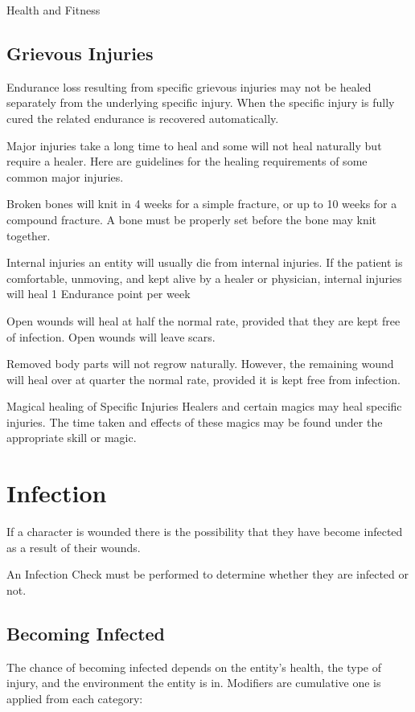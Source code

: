 \begin{Chapter}{Health and Fitness}
\subsection{Grievous Injuries}

Endurance loss resulting from specific grievous injuries may not be
healed separately from the underlying specific injury.  When the
specific injury is fully cured the related endurance is recovered
automatically.

Major injuries take a long time to heal and some will not heal
naturally but require a healer.  Here are guidelines for the healing
requirements of some common major injuries.

Broken bones will knit in 4 weeks for a simple fracture, or up to 10
weeks for a compound fracture.  A bone must be properly set before the
bone may knit together.

Internal injuries an entity will usually die from internal injuries.
If the patient is comfortable, unmoving, and kept alive by a healer or
physician, internal injuries will heal 1 Endurance point per week

Open wounds will heal at half the normal rate, provided that they are
kept free of infection. Open wounds will leave scars.

Removed body parts will not regrow naturally.  However, the remaining
wound will heal over at quarter the normal rate, provided it is kept
free from infection.

Magical healing of Specific Injuries Healers and certain magics may
heal specific injuries. The time taken and effects of these magics may
be found under the appropriate skill or magic.


\section{Infection}

If a character is wounded there is the possibility that they have
become infected as a result of their wounds.

An Infection Check must be performed to determine whether they are
infected or not.

\subsection{Becoming Infected}

The chance of becoming infected depends on the entity’s health, the
type of injury, and the environment the entity is in.   Modifiers are
cumulative one is applied from each category:


\end{Chapter}
